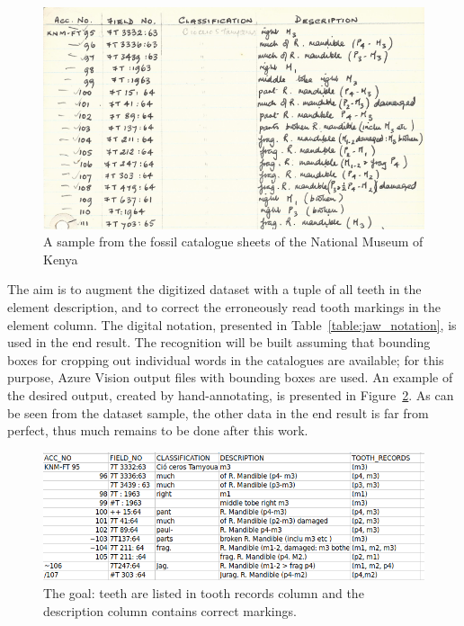 \documentclass[english,twoside,openright]{UH_DS_MSc}
\begin{document}
\begin{figure}[h]
    \centering
    \includegraphics*[scale=0.5]{images/cataloguesample3.png}
    \caption{A sample from the fossil catalogue sheets of the National Museum of Kenya}
    \label{image:cataloguesample}
\end{figure}

The aim is to augment the digitized dataset with a tuple of all teeth in the 
element description, and to correct the erroneously read tooth markings in the element column.
The digital notation, presented in Table~\ref{table:jaw_notation}, is used in the end result.
The recognition will be built assuming that bounding boxes for cropping out individual words in the 
catalogues are available; for this purpose, Azure Vision output files with bounding boxes
are used. An example of the desired output,
created by hand-annotating, is presented in Figure~\ref{image:goal}. 
As can be seen from the dataset sample, the other data in the end result is far from perfect, thus
 much remains to be done after this work.

\begin{figure}[h]
    \centering
    \includegraphics*[scale=0.5]{images/goal.png}
    \caption{The goal: teeth are listed in tooth records column and the description column contains correct markings.}
    \label{image:goal}
\end{figure}
\end{document}

